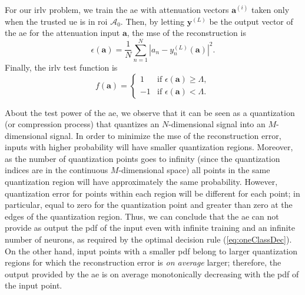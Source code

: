 \documentclass[draftcls,onecolumn,12pt]{IEEEtran}
\begin{document}
For our \ac{irlv} problem, we train the \ac{ae} with attenuation vectors $\bm{a}^{(i)}$ taken only when the trusted \ac{ue} is in  \ac{roi} $\mathcal A_0$. Then, by letting $\bm{y}^{(L)}$ be the output vector of the \ac{ae} for the attenuation input $\bm{a}$, the \ac{mse} of the reconstruction is 
\begin{equation}\label{eq: rec err}
    \epsilon(\bm{a} ) = \frac{1}{N}\sum_{n=1}^{N}|a_n-y^{(L)}_n(\bm{a})|^2.
\end{equation}
Finally, the \ac{irlv} test function  is  
\begin{equation}
f(\bm{a}) =
\begin{cases}
1 &\text{if } \epsilon(\bm{a} ) \geq \Lambda, \\
-1 & \text{if } \epsilon(\bm{a} ) < \Lambda.
\end{cases}
\end{equation}

About the test power of the \ac{ae}, we observe that it can be seen as a quantization (or compression process) that quantizes an $N$-dimensional signal into an $M$-dimensional signal. In order to minimize the \ac{mse} of the reconstruction error, inputs with higher probability will have smaller quantization regions. Moreover, as the number of quantization points goes to infinity (since the quantization indices are in the continuous $M$-dimensional space) all points in the same quantization region will have approximately the same probability. However, quantization error for points within each region will be different for each point; in particular, equal to zero for the quantization point and greater than zero at the edges of the quantization region. Thus, we can conclude that the \ac{ae} can not provide as output the \ac{pdf} of the input even with infinite training and an infinite number of neurons, as required by the optimal decision rule (\ref{eq:oneClassDec}). On the other hand, input points with a smaller \ac{pdf} belong to larger quantization regions for which the reconstruction error is {\em on average} larger; therefore, the output provided by the \ac{ae} is on average monotonically decreasing with the \ac{pdf} of the input point. 
\end{document}

